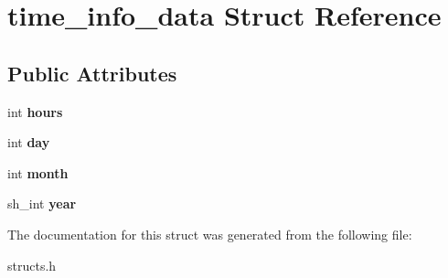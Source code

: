 \hypertarget{structtime__info__data}{}\section{time\+\_\+info\+\_\+data Struct Reference}
\label{structtime__info__data}
\subsection*{Public Attributes}
\begin{DoxyCompactItemize}
\item 
\mbox{\label{structtime__info__data_a9ddc4c4ad13fd6c00d376ae3ae4bd510}} 
int {\bfseries hours}
\item 
\mbox{\label{structtime__info__data_a1f01632ffda7d65eac96af317c583314}} 
int {\bfseries day}
\item 
\mbox{\label{structtime__info__data_a22108b21961f4f9cec8b54a4b4c4d84d}} 
int {\bfseries month}
\item 
\mbox{\label{structtime__info__data_a47f7f27801a45fde525317492ef722df}} 
sh\+\_\+int {\bfseries year}
\end{DoxyCompactItemize}


The documentation for this struct was generated from the following file\+:\begin{DoxyCompactItemize}
\item 
structs.\+h\end{DoxyCompactItemize}
